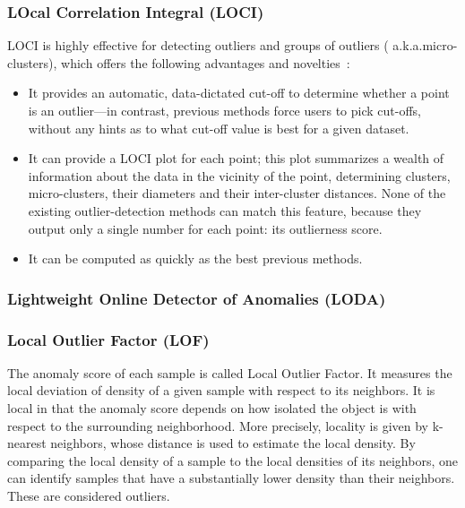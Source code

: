 \subsubsection{LOcal Correlation Integral (LOCI)}
\label{subsubsec:introduction:related-works:loci}
LOCI is highly effective for detecting outliers and groups of outliers ( a.k.a.micro-clusters), which offers the following advantages and novelties~\cite{papadimitriou2003loci}:
\begin{itemize}
    \item It provides an automatic, data-dictated cut-off to determine whether a point is an outlier—in contrast, previous methods force users to pick cut-offs, without any hints as to what cut-off value is best for a given dataset.
    \item It can provide a LOCI plot for each point; this plot summarizes a wealth of information about the data in the vicinity of the point, determining clusters, micro-clusters, their diameters and their inter-cluster distances. None of the existing outlier-detection methods can match this feature, because they output only a single number for each point: its outlierness score.
    \item It can be computed as quickly as the best previous methods.
\end{itemize}

\subsubsection{Lightweight Online Detector of Anomalies (LODA)}
\label{subsubsec:introduction:related-works:loda}
\cite{pevny2016loda}

\subsubsection{Local Outlier Factor (LOF)}
\label{subsubsec:introduction:related-works:lof}
The anomaly score of each sample is called Local Outlier Factor.
It measures the local deviation of density of a given sample with respect to its neighbors.
It is local in that the anomaly score depends on how isolated the object is with respect to the surrounding neighborhood.
More precisely, locality is given by k-nearest neighbors, whose distance is used to estimate the local density.
By comparing the local density of a sample to the local densities of its neighbors, one can identify samples that have a substantially lower density than their neighbors.
These are considered outliers.
\cite{breunig2000lof}

